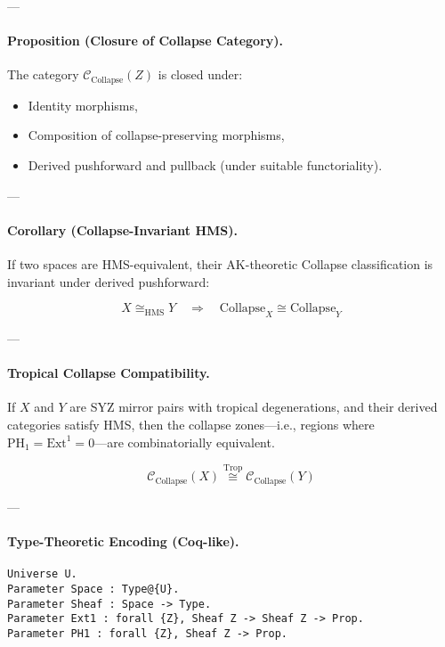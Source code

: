 \documentclass[11pt]{article}
\begin{document}
\begin{axiom}
\begin{axiom}
{{---

\paragraph{Proposition (Closure of Collapse Category).}

The category \( \mathcal{C}_{\text{Collapse}}(Z) \) is closed under:
\begin{itemize}
  \item Identity morphisms,
  \item Composition of collapse-preserving morphisms,
  \item Derived pushforward and pullback (under suitable functoriality).
\end{itemize}

---

\paragraph{Corollary (Collapse-Invariant HMS).}

If two spaces are HMS-equivalent, their AK-theoretic Collapse classification is invariant under derived pushforward:

\[
X \cong_{\mathrm{HMS}} Y \quad \Longrightarrow \quad \mathrm{Collapse}_X \cong \mathrm{Collapse}_Y
\]

---

\paragraph{Tropical Collapse Compatibility.}

If \( X \) and \( Y \) are SYZ mirror pairs with tropical degenerations,  
and their derived categories satisfy HMS, then the collapse zones—i.e.,  
regions where \( \mathrm{PH}_1 = \mathrm{Ext}^1 = 0 \)—are combinatorially equivalent.

\[
\mathcal{C}_{\text{Collapse}}(X) \overset{\mathrm{Trop}}{\cong} \mathcal{C}_{\text{Collapse}}(Y)
\]

---

\paragraph{Type-Theoretic Encoding (Coq-like).}

\begin{lstlisting}[language=Coq, caption=Collapse Functor Equivalence in Type Theory]
Universe U.
Parameter Space : Type@{U}.
Parameter Sheaf : Space -> Type.
Parameter Ext1 : forall {Z}, Sheaf Z -> Sheaf Z -> Prop.
Parameter PH1 : forall {Z}, Sheaf Z -> Prop.


\end{lstlisting}}}
\end{axiom}
\end{axiom}
\end{document}
